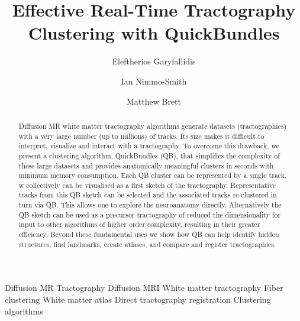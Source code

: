 \documentclass[preprint,authoryear,a4paper,10pt,onecolumn]{elsarticle}
\begin{document}
\begin{frontmatter}

\title{Effective Real-Time Tractography Clustering with QuickBundles}

\author[UC]{Eleftherios Garyfallidis}

\author[CBU]{Ian Nimmo-Smith}

\author[Berkeley]{Matthew Brett}


\address[UC]{University of Cambridge, UK}

\address[CBU]{MRC Cognition and Brain Sciences Unit, Cambridge, UK}

\address[Berkeley]{University of California, Berkeley CA, USA}

\begin{abstract}
  Diffusion MR white matter tractography algorithms generate datasets
  (tractographies) with a very large number (up to millions) of
  tracks. Its size makes it difficult to interpret, visualize and
  interact with a tractography. To overcome this drawback, we present a
  clustering algorithm, QuickBundles (QB), that simplifies the
  complexity of these large datasets and provides anatomically
  meaningful clusters in seconds with minimum memory consumption. Each
  QB cluster can be represented by a single track, w collectively can be
  visualised as a first sketch of the tractography. Representative
  tracks from this QB sketch can be selected and the associated tracks
  re-clustered in turn via QB. This allows one to explore the
  neuroanatomy directly. Alternatively the QB sketch can be used as a
  precursor tractography of reduced the dimensionality for input to
  other algorithms of higher order complexity, resulting in their
  greater efficiency. Beyond these fundamental uses we show how QB can
  help identify hidden structures, find landmarks, create atlases, and
  compare and register tractographies.
\end{abstract}

\begin{keyword}
Diffusion MR Tractography
Diffusion MRI
White matter tractography
Fiber clustering
White matter atlas
Direct tractography registration
Clustering algorithms
\end{keyword}
\end{frontmatter}
\end{document}
